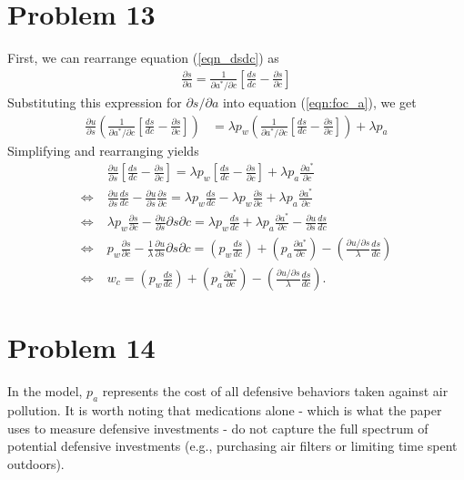 \documentclass[12pt]{article}
\begin{document}
\section*{Problem 13}
First, we can rearrange equation (\ref{eqn_dsdc}) as
\begin{align*}
	\frac{\partial s}{\partial a} = \frac{1}{\partial a^* / \partial c} \left[ \frac{d s}{d c} - \frac{\partial s}{\partial c} \right]
\end{align*}
Substituting this expression for $\partial s/\partial a$ into equation (\ref{eqn:foc_a}), we get
\begin{align*}
	\frac{\partial u}{\partial s} \left( \frac{1}{\partial a^* / \partial c} \left[ \frac{d s}{d c} - \frac{\partial s}{\partial c} \right] \right) &= \lambda p_w \left( \frac{1}{\partial a^* / \partial c} \left[ \frac{d s}{d c} - \frac{\partial s}{\partial c} \right] \right)  + \lambda p_a
\end{align*}
Simplifying and rearranging yields
\begin{align}
	& \frac{\partial u}{\partial s} \left[ \frac{d s}{d c} - \frac{\partial s}{\partial c} \right] = \lambda p_w \left[ \frac{d s}{d c} - \frac{\partial s}{\partial c} \right] + \lambda p_a \frac{\partial a^*}{\partial c} \nonumber \\
	\Leftrightarrow \; & \frac{\partial u}{\partial s} \frac{ds}{dc} - \frac{\partial u}{\partial s} \frac{\partial s}{\partial c} = \lambda p_w \frac{ds}{dc} - \lambda p_w \frac{\partial s}{\partial c} + \lambda p_a \frac{\partial a^*}{\partial c} \nonumber \\
	\Leftrightarrow \; & \lambda p_w \frac{\partial s}{\partial c} - \frac{\partial u}{\partial s}{\partial s}{\partial c} =  \lambda p_w \frac{ds}{dc} + \lambda p_a \frac{\partial a^*}{\partial c} - \frac{\partial u}{\partial s} \frac{ds}{dc} \nonumber \\
	\Leftrightarrow \; & p_w \frac{\partial s}{\partial c} - \frac{1}{\lambda} \frac{\partial u}{\partial s}{\partial s}{\partial c} =  \left(p_w \frac{ds}{dc} \right) + \left( p_a \frac{\partial a^*}{\partial c} \right) - \left( \frac{\partial u / \partial s}{\lambda} \frac{ds}{dc} \right) \nonumber \nonumber \\
	\Leftrightarrow \; & w_c =  \left(p_w \frac{ds}{dc} \right) + \left( p_a \frac{\partial a^*}{\partial c} \right) - \left( \frac{\partial u / \partial s}{\lambda} \frac{ds}{dc} \right).
\end{align}

\section*{Problem 14}
In the model, $p_a$ represents the cost of all defensive behaviors taken against air pollution. It is worth noting that medications alone - which is what the paper uses to measure defensive investments - do not capture the full spectrum of potential defensive investments (e.g., purchasing air filters or limiting time spent outdoors). 
\end{document}
